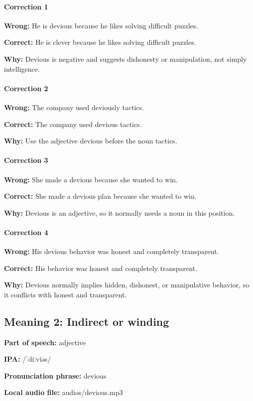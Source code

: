 \documentclass[11pt]{article}
\begin{document}
\paragraph{Correction 1}
\textbf{Wrong:} He is devious because he likes solving difficult puzzles.

\textbf{Correct:} He is clever because he likes solving difficult puzzles.

\textbf{Why:} Devious is negative and suggests dishonesty or manipulation, not simply intelligence.

\paragraph{Correction 2}
\textbf{Wrong:} The company used deviously tactics.

\textbf{Correct:} The company used devious tactics.

\textbf{Why:} Use the adjective devious before the noun tactics.

\paragraph{Correction 3}
\textbf{Wrong:} She made a devious because she wanted to win.

\textbf{Correct:} She made a devious plan because she wanted to win.

\textbf{Why:} Devious is an adjective, so it normally needs a noun in this position.

\paragraph{Correction 4}
\textbf{Wrong:} His devious behavior was honest and completely transparent.

\textbf{Correct:} His behavior was honest and completely transparent.

\textbf{Why:} Devious normally implies hidden, dishonest, or manipulative behavior, so it conflicts with honest and transparent.

\subsection{Meaning 2: Indirect or winding}
\textbf{Part of speech:} adjective

\textbf{IPA:} /ˈdiːviəs/

\textbf{Pronunciation phrase:} devious

\textbf{Local audio file:} audios/devious.mp3
\end{document}
